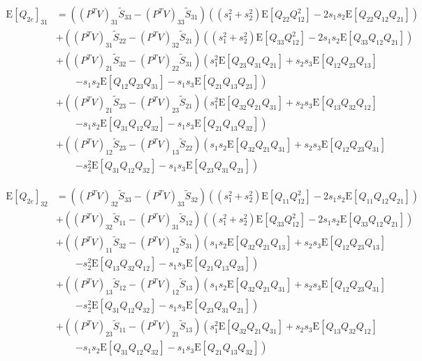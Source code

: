 \documentclass[10pt]{article}
\newcommand{\expect}[1]{\ensuremath{\mathrm{E}\left[ #1 \right]}}
\begin{document}
\begin{align}
	\expect{Q_{2e}}_{31} &= \left( (P^TV)_{31}\tilde{S}_{33} - (P^TV)_{33}\tilde{S}_{31} \right)\left( (s_1^2+s_2^2)\expect{Q_{22}Q_{12}^2} - 2s_1s_2\expect{Q_{22}Q_{12}Q_{21}} \right) \nonumber \\
	&+ \left( (P^TV)_{31}\tilde{S}_{22} - (P^TV)_{32}\tilde{S}_{21} \right)\left( (s_1^2+s_2^2)\expect{Q_{33}Q_{12}^2} - 2s_1s_2\expect{Q_{33}Q_{12}Q_{21}} \right) \nonumber \\
	&+ \left( (P^TV)_{21}\tilde{S}_{32} - (P^TV)_{22}\tilde{S}_{31} \right)\left( s_1^2\expect{Q_{23}Q_{31}Q_{21}} + s_2s_3\expect{Q_{12}Q_{23}Q_{13}} \right. \nonumber \\ &\qquad \left. - s_1s_2\expect{Q_{12}Q_{23}Q_{31}} - s_1s_3\expect{Q_{21}Q_{13}Q_{23}} \right) \nonumber \\
	&+ \left( (P^TV)_{21}\tilde{S}_{23} - (P^TV)_{23}\tilde{S}_{21} \right)\left( s_1^2\expect{Q_{32}Q_{21}Q_{31}} + s_2s_3\expect{Q_{13}Q_{32}Q_{12}} \right. \nonumber \\ &\qquad \left. - s_1s_2\expect{Q_{31}Q_{12}Q_{32}} - s_1s_3\expect{Q_{21}Q_{13}Q_{32}} \right) \nonumber \\
	&+ \left( (P^TV)_{12}\tilde{S}_{23} - (P^TV)_{13}\tilde{S}_{22} \right)\left( s_1s_2\expect{Q_{32}Q_{21}Q_{31}} + s_2s_3\expect{Q_{12}Q_{23}Q_{31}} \right. \nonumber \\ &\qquad \left. - s_2^2\expect{Q_{31}Q_{12}Q_{32}} - s_1s_3\expect{Q_{23}Q_{31}Q_{21}} \right)
\end{align}

\begin{align}
	\expect{Q_{2e}}_{32} &= \left( (P^TV)_{32}\tilde{S}_{33} - (P^TV)_{33}\tilde{S}_{32} \right)\left( (s_1^2+s_2^2)\expect{Q_{11}Q_{12}^2} - 2s_1s_2\expect{Q_{11}Q_{12}Q_{21}} \right) \nonumber \\
	&+ \left( (P^TV)_{32}\tilde{S}_{11} - (P^TV)_{31}\tilde{S}_{12} \right)\left( (s_1^2+s_2^2)\expect{Q_{33}Q_{12}^2} - 2s_1s_2\expect{Q_{33}Q_{12}Q_{21}} \right) \nonumber \\
	&+ \left( (P^TV)_{11}\tilde{S}_{32} - (P^TV)_{12}\tilde{S}_{31} \right)\left( s_1s_2\expect{Q_{32}Q_{21}Q_{13}} + s_2s_3\expect{Q_{12}Q_{23}Q_{13}} \right. \nonumber \\ &\qquad \left. - s_2^2\expect{Q_{13}Q_{32}Q_{12}} - s_1s_3\expect{Q_{21}Q_{13}Q_{23}} \right) \nonumber \\
	&+ \left( (P^TV)_{13}\tilde{S}_{12} - (P^TV)_{12}\tilde{S}_{13} \right)\left( s_1s_2\expect{Q_{32}Q_{21}Q_{31}} + s_2s_3\expect{Q_{12}Q_{23}Q_{31}} \right. \nonumber \\ &\qquad \left. - s_2^2\expect{Q_{31}Q_{12}Q_{32}} - s_1s_3\expect{Q_{23}Q_{31}Q_{21}} \right) \nonumber \\
	&+ \left( (P^TV)_{23}\tilde{S}_{11} - (P^TV)_{21}\tilde{S}_{13} \right)\left( s_1^2\expect{Q_{32}Q_{21}Q_{31}} + s_2s_3\expect{Q_{13}Q_{32}Q_{12}} \right. \nonumber \\ &\qquad \left. - s_1s_2\expect{Q_{31}Q_{12}Q_{32}} - s_1s_3\expect{Q_{21}Q_{13}Q_{32}} \right)
\end{align}
\end{document}
